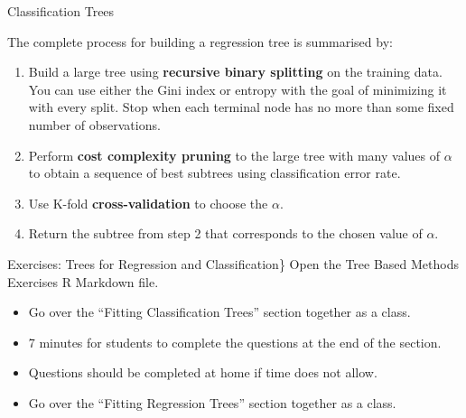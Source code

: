 \documentclass[
  ignorenonframetext,
  aspectratio=169,
]{beamer}
\begin{document}
\begin{frame}{Classification Trees}
\protect\hypertarget{classification-trees-1}{}
\begin{block}{The complete process for building a regression tree is
summarised by:}
\protect\hypertarget{the-complete-process-for-building-a-regression-tree-is-summarised-by-1}{}
\begin{enumerate}
\item
  Build a large tree using \textbf{recursive binary splitting} on the
  training data. You can use either the Gini index or entropy with the
  goal of minimizing it with every split. Stop when each terminal node
  has no more than some fixed number of observations.
\item
  Perform \textbf{cost complexity pruning} to the large tree with many
  values of \(\alpha\) to obtain a sequence of best subtrees using
  classification error rate.
\item
  Use K-fold \textbf{cross-validation} to choose the \(\alpha\).
\item
  Return the subtree from step 2 that corresponds to the chosen value of
  \(\alpha\).
\end{enumerate}
\end{block}
\end{frame}

\begin{frame}{Exercises: Trees for Regression and Classification\}}
\protect\hypertarget{exercises-trees-for-regression-and-classification}{}
Open the Tree Based Methods Exercises R Markdown file.

\begin{itemize}
\item
  Go over the ``Fitting Classification Trees'' section together as a
  class.
\item
  7 minutes for students to complete the questions at the end of the
  section.
\item
  Questions should be completed at home if time does not allow.
\item
  Go over the ``Fitting Regression Trees'' section together as a class.
\end{itemize}
\end{frame}
\end{document}
